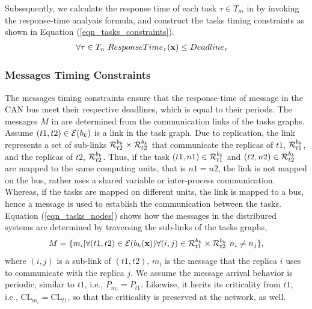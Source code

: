 Subsequently, we calculate the response time of each task $\tau \in T_{m}$ in \ttx by invoking the response-time analyais formula, and construct the tasks timing constraints as shown in Equation (\ref{eqn_tasks_constraints}).
\begin{align}
\label{eqn_tasks_constraints}
\forall \tau\in T_{n} \ ResponseTime_\tau(\textbf{x})&\leq Deadline_\tau
\end{align}

\subsubsection{Messages Timing Constraints}
The messages timing constraints ensure that the response-time of message in the CAN bus meet their respective deadlines, which is equal to their periods. The messages $M$ in \ttx are determined from the communication links of the tasks graphs. Assume $(t1,t2)\in\mathcal{E}(b_{k})$ is a link in the task graph. Due to replication, the link represents a set of sub-links $\sss{\mathcal{R}}[k][t2][b]\times\sss{\mathcal{R}}[k][t2][b]$ that communicate the replicas of $t1$, $\sss{\mathcal{R}}[k][t1][b]$, and the replicas of $t2$, $\sss{\mathcal{R}}[k][t2][b]$. Thus, if the task $(t1,n1)\in\sss{\mathcal{R}}[k][t1][b]$ and $(t2,n2)\in\sss{\mathcal{R}}[k][t2][b]$ are mapped to the same  computing units, that is $n1=n2$, the link is not mapped on the bus, rather uses a shared variable or inter-process communication. Whereas, if the tasks are mapped on different units, the link is mapped to a bus, hence a message is used to establish the communication between the tasks. Equation (\ref{eqn_tasks_nodes}) shows how the messages in the distribured systems are determined by traversing the sub-links of the tasks graphs, 
\begin{equation}
\label{eqn_tasks_nodes}
M=\{m_i | \forall (t1,t2)\in \mathcal{E}(\atx)\forall (i,j)\in\sss{\mathcal{R}}[k][t1][b]\times\sss{\mathcal{R}}[k][t2][b]\ n_i\neq n_j\},
\end{equation}
where $(i,j)$ is a sub-link of $(t1,t2)$, $m_{i}$ is the message that the replica $i$ uses to communicate with the replica $j$.  We assume the message arrival behavior is periodic, similar to $t1$, i.e., $P_{m_i }= P_{t1}$. Likewise, it herits its criticality from $t1$, i.e., $\mathrm{CL}_{m_i}=\mathrm{CL}_{t1}$, so that the criticality is preserved at the network, as well.

